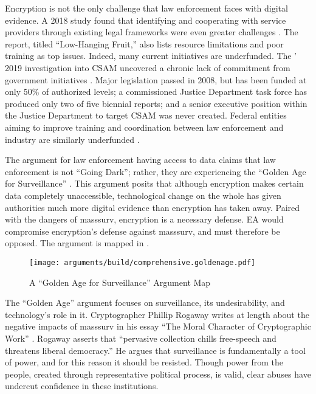 Encryption is not the only challenge that law enforcement faces with digital evidence. A 2018 study found that
identifying and cooperating with service providers through existing legal frameworks were even greater challenges
\cite{carter_2018}. The report, titled ``Low-Hanging Fruit,'' also lists resource limitations and poor training as top
issues. Indeed, many current initiatives are underfunded. The ' 2019 investigation into \ac{CSAM}
uncovered a chronic lack of commitment from government initiatives \cite{keller_internet_2019}. Major legislation passed
in 2008, but has been funded at only 50\% of authorized levels; a commissioned Justice Department task force has
produced only two of five biennial reports; and a senior executive position within the Justice Department to target
\ac{CSAM} was never created. Federal entities aiming to improve training and coordination between law enforcement and
industry are similarly underfunded \cite{carter_2018}.


The argument for law enforcement having  access to data claims that law enforcement is not ``Going Dark'';
rather, they are experiencing the ``Golden Age for Surveillance'' \cite{swire_encryption_2011}. This argument posits
that although encryption makes certain data completely unaccessible, technological change on the whole has given
authorities much more digital evidence than encryption has taken away. Paired with the dangers of \ac{masssurv},
encryption is a necessary defense. \Ac{EA} would compromise encryption's defense against \ac{masssurv}, and must
therefore be opposed. The argument is mapped in .

\begin{figure}[p!]
  \centering\CaptionFontSize
  \texttt{[image: arguments/build/comprehensive.goldenage.pdf]}
  \caption{A ``Golden Age for Surveillance'' Argument Map}
  \label{fig-arg-golden-age}
\end{figure}

The ``Golden Age'' argument focuses on surveillance, its undesirability, and technology's role in it. Cryptographer
Phillip Rogaway writes at length about the negative impacts of \ac{masssurv} in his essay ``The Moral Character of
Cryptographic Work'' \cite{rogaway_moral_2015}. Rogaway asserts that ``pervasive collection  chills
free-speech and threatens liberal democracy.'' He argues that surveillance is fundamentally a tool of power, and for
this reason it should be resisted. Though power from the people, created through representative political process, is
valid, clear abuses have undercut confidence in these institutions.

